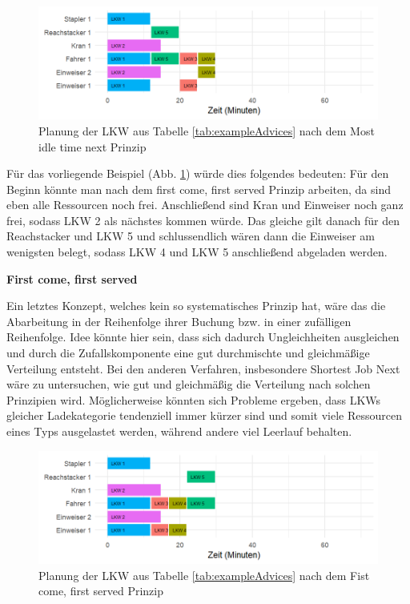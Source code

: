 \begin{figure}[H]
    \centering
    \includegraphics[width=\textwidth]{images/timelines/rsMostIdleExample.png}
    \caption{Planung der LKW aus Tabelle \ref{tab:exampleAdvices} nach dem Most idle time next Prinzip}
    \label{fig:rsMitnExample}
\end{figure}

Für das vorliegende Beispiel  (Abb. \ref{fig:rsMitnExample}) würde dies folgendes bedeuten: Für den Beginn könnte man nach dem first come, first served Prinzip arbeiten, da sind eben alle Ressourcen noch frei. Anschließend sind Kran und Einweiser noch ganz frei, sodass LKW 2 als nächstes kommen würde. Das gleiche gilt danach für den Reachstacker und LKW 5 und schlussendlich wären dann die Einweiser am wenigsten belegt, sodass LKW 4 und LKW 5 anschließend abgeladen werden.

\textbf{First come, first served}

Ein letztes Konzept, welches kein so systematisches Prinzip hat, wäre das die Abarbeitung in der Reihenfolge ihrer Buchung bzw. in einer zufälligen Reihenfolge. Idee könnte hier sein, dass sich dadurch Ungleichheiten ausgleichen und durch die Zufallskomponente eine gut durchmischte und gleichmäßige Verteilung entsteht. Bei den anderen Verfahren, insbesondere \glqq{}Shortest Job Next\grqq{} wäre zu untersuchen, wie gut und gleichmäßig die Verteilung nach solchen Prinzipien wird. Möglicherweise könnten sich Probleme ergeben, dass LKWs gleicher Ladekategorie tendenziell immer kürzer sind und somit viele Ressourcen eines Typs ausgelastet werden, während andere viel Leerlauf behalten.

\begin{figure}[H]
    \centering
    \includegraphics[width=\textwidth]{images/timelines/rsFcfsExample.png}
    \caption{Planung der LKW aus Tabelle \ref{tab:exampleAdvices} nach dem Fist come, first served Prinzip}
    \label{fig:rsFcfsExample}
\end{figure}

